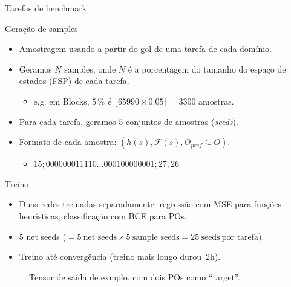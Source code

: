 \documentclass{beamer}
\begin{document}
\begin{frame}{Tarefas de benchmark}

\end{frame}

\begin{frame}{Geração de samples}
\begin{itemize}
  \item Amostragem usando \bfsrs a partir do gol de uma tarefa de cada domínio.
  \pause
  \item Geramos $N$ samples, onde $N$ é a porcentagem do tamanho do espaço de estados (FSP) de cada tarefa.
    \begin{itemize}
      \item e.g. em Blocks, $5\,\%$ é $\lfloor 65990 \times 0.05 \rceil = 3300$ amostras.
    \end{itemize}
  \pause
  \item Para cada tarefa, geramos $5$ conjuntos de amostras (\emph{seeds}).
  \pause
  \item Formato de cada amostra: $(h(s), \mathcal{F}(s), O_{pref} \subseteq O)$.
    \begin{itemize}
      \item $15;000000011110\ldots000100000001;27,26$
    \end{itemize}
\end{itemize}
\end{frame}

\begin{frame}{Treino}
\begin{itemize}
  \item Duas redes treinadas separadamente: \alert{regressão} com MSE para funções heurísticas, \alert{classificação} com BCE para POs.
  \pause
  \item $5$ net seeds ($= 5~\text{net seeds} \times 5~\text{sample seeds} = 25~\text{seeds}~\text{por tarefa}$).
  \pause
  \item Treino até convergência (treino mais longo durou~$2$h).
\end{itemize}

\pause
\begin{figure}[tb]
\caption[]{Tensor de saída de exmplo, com dois POs como ``target''.}
\centering
{}
\label{fig:po-tensor}
\end{figure}

\end{frame}
\end{document}
